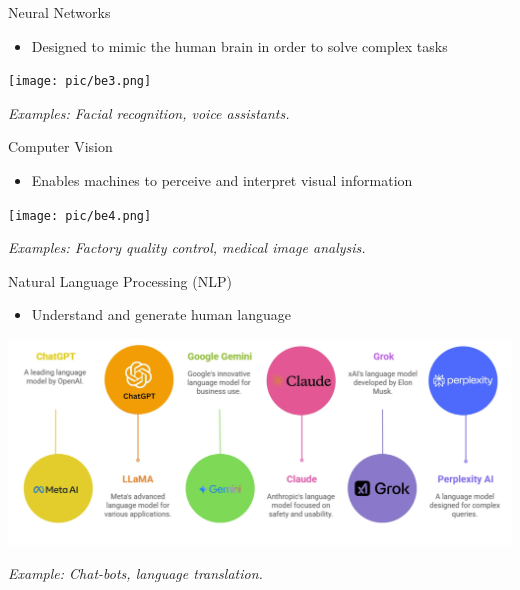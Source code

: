 \documentclass[serif, aspectratio=169]{beamer}
\begin{document}
    \begin{frame}{Neural Networks}
        \begin{itemize}
            \item Designed to mimic the human brain in order to solve complex tasks
        \end{itemize}
        \vspace{0.4cm}
        \begin{center}
            \texttt{[image: pic/be3.png]}
        \end{center}
        \vspace{0.3cm}
        \begin{center}
            \textit{Examples: Facial recognition, voice assistants.}
        \end{center}
    \end{frame}

    \begin{frame}{Computer Vision}
        \begin{itemize}
            \item Enables machines to perceive and interpret visual information
        \end{itemize}
        \begin{center}
            \texttt{[image: pic/be4.png]}
        \end{center}
        \begin{center}
            \textit{Examples: Factory quality control, medical image analysis.}
        \end{center}
    \end{frame}


    \begin{frame}{Natural Language Processing (NLP)}
        \begin{itemize}
            \item Understand and generate human language
        \end{itemize}
        \vspace{0.5cm}
        \begin{center}
            \includegraphics[width=0.6\linewidth]{pic/be5.png}
        \end{center}
        \begin{center}
            \textit{Example: Chat-bots, language translation.}
        \end{center}
    \end{frame}
\end{document}
